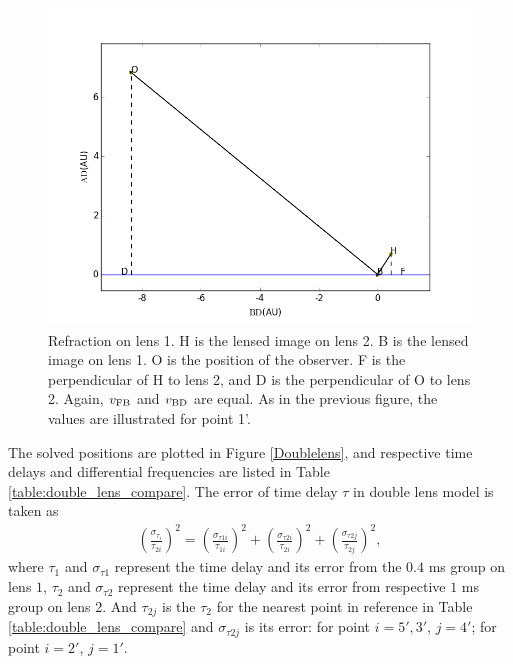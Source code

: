 \documentclass[useAMS,usenatbib]{mn2e}
\begin{document}
\begin{figure}
\centering
\includegraphics[width=1.0\linewidth]{Second_reflection.png}
\caption{Refraction on lens 1. 
H is the lensed image on lens 2. B is the lensed image on lens 1. O is
the position of the observer. F is the perpendicular of H to lens 2,
and D is the perpendicular of O to lens 2. Again, $v_{\rm FB}$ and $v_{\rm
  BD}$ are equal.
 As in the previous figure, the values are illustrated for point 1'. }
\label{second_reflect}
\end{figure}



The solved positions are plotted in Figure \ref{Doublelens}, and
respective time delays and differential frequencies are listed in
Table \ref{table:double_lens_compare}. The error of time delay $\tau$
in double lens model is taken as
\begin{equation}
\begin{aligned}
(\frac{\sigma_{\tau_i}}{\tau_{2i}})^2 = (\frac{\sigma_{\tau1i}}{\tau_{1i}})^2+(\frac{\sigma_{\tau2i}}{\tau_{2i}})^2 + (\frac{\sigma_{\tau2j}}{\tau_{2j}})^2,
\end{aligned}
\end{equation}
where $\tau_1$ and $\sigma_{\tau1}$ represent the time delay and its
error from the $0.4$ ms group on lens $1$, $\tau_2$ and
$\sigma_{\tau2}$ represent the time delay and its error from
respective $1$ ms group on lens 2. And $\tau_{2j}$ is the $\tau_2$ for
the nearest point in reference in Table
\ref{table:double_lens_compare} and $\sigma_{\tau2j}$ is its error:
for point $i=5',3'$, $j=4'$; for point $i=2'$, $j=1'$.
\end{document}
